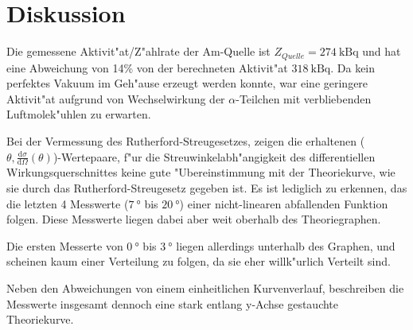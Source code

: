 \section{Diskussion}
\label{sec:Diskussion}
  Die gemessene Aktivit"at/Z"ahlrate der Am-Quelle ist $Z_{Quelle}=\SI{274}{\kilo \becquerel}$ und hat eine Abweichung von 14\% von der berechneten Aktivit"at $\SI{318}{\kilo \becquerel}$.
  Da kein perfektes Vakuum im Geh"ause erzeugt werden konnte, war eine geringere Aktivit"at aufgrund von Wechselwirkung der $\alpha$-Teilchen mit verbliebenden Luftmolek"uhlen zu erwarten.
  
  Bei der Vermessung des Rutherford-Streugesetzes, zeigen die erhaltenen ($\theta,\frac{\text{d}\sigma}{\text{d}\Omega}(\theta)$)-Wertepaare, f"ur die Streuwinkelabh"angigkeit des differentiellen Wirkungsquerschnittes keine gute "Ubereinstimmung mit der Theoriekurve, wie sie durch das Rutherford-Streugesetz gegeben ist.
  Es ist lediglich zu erkennen, das die letzten 4 Messwerte ($\SI{7}{\degree}$ bis $\SI{20}{\degree}$) einer nicht-linearen abfallenden Funktion folgen.
  Diese Messwerte liegen dabei aber weit oberhalb des Theoriegraphen.

  Die ersten Messerte von $\SI{0}{\degree}$ bis $\SI{3}{\degree}$ liegen allerdings unterhalb des Graphen, und scheinen kaum einer Verteilung zu folgen, da sie eher willk"urlich Verteilt sind.

  Neben den Abweichungen von einem einheitlichen Kurvenverlauf, beschreiben die Messwerte insgesamt dennoch eine stark entlang y-Achse gestauchte Theoriekurve.
